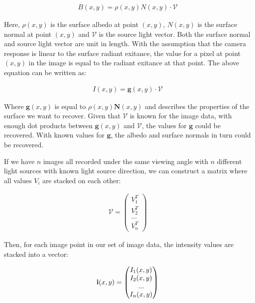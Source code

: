 	\begin{eqnarray*}
		B(x,y) = \rho(x,y)N(x,y) \cdot \mathcal{V}
	\end{eqnarray*}

\noindent Here, $\rho(x,y)$ is the surface albedo at point $(x,y)$, $N(x,y)$ is the surface normal at point $(x,y)$ and $\mathcal{V}$ is the source light vector. Both the surface normal and source light vector are unit in length. With the assumption that the camera response is linear to the surface radiant exitance, the value for a pixel at point $(x,y)$ in the image is equal to the radiant exitance at that point. The above equation can be written as:

	\begin{eqnarray*}
		I(x,y) =  \textbf{g}(x,y) \cdot \mathcal{V}
	\end{eqnarray*}

\noindent Where $\textbf{g}(x,y)$ is equal to $\rho(x,y)\textbf{N}(x,y)$ and describes the properties of the surface we want to recover. Given that $\mathcal{V}$ is known for the image data, with enough dot products between $\textbf{g}(x,y)$ and $\mathcal{V}$, the values for $\textbf{g}$ could be recovered. With known values for $\textbf{g}$, the albedo and surface normals in turn could be recovered.

If we have $n$ images all recorded under the same viewing angle with $n$ different light sources with known light source direction, we can construct a matrix where all values $V_i$ are stacked on each other:

	\begin{eqnarray*}
		\mathcal{V} = \begin{pmatrix} V_1^T \\ V_2^T \\ ... \\ V_n^T \end{pmatrix}
	\end{eqnarray*}

\noindent Then, for each image point in our set of image data, the intensity values are stacked into a vector:

	\begin{eqnarray*}
		{\bf i}(x,y) = \begin{pmatrix} I_1(x,y) \\ I_2(x,y) \\ ... \\ I_n(x,y) \end{pmatrix}
	\end{eqnarray*}

